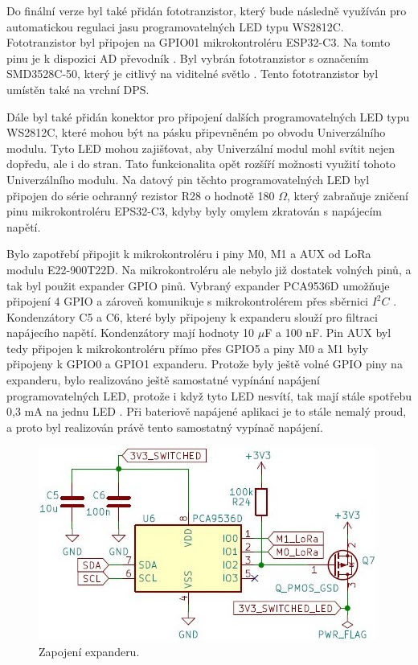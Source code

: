 Do finální verze byl také přidán fototranzistor, který bude následně využíván pro automatickou regulaci jasu programovatelných LED typu WS2812C. Fototranzistor byl připojen na GPIO01 mikrokontroléru ESP32-C3. Na tomto 
pinu je k dispozici AD převodník \cite{ESP_C3_dtsh}. Byl vybrán fototranzistor s označením SMD3528C-50, který je citlivý na viditelné světlo \cite{Phototransistor}.
Tento fototranzistor byl umístěn také na vrchní DPS. 

Dále byl také 
přidán konektor pro připojení dalších programovatelných LED typu WS2812C, které mohou být na pásku připevněném po obvodu Univerzálního modulu. Tyto LED mohou zajišťovat, aby Univerzální modul mohl svítit 
nejen dopředu, ale i do stran. Tato funkcionalita opět rozšíří možnosti využití tohoto Univerzálního modulu. Na datový pin těchto programovatelných LED byl připojen do série ochranný rezistor R28 o hodnotě 
180 $\Omega$, který 
zabraňuje zničení pinu mikrokontroléru EPS32-C3, kdyby byly omylem zkratován s napájecím napětí. 

Bylo zapotřebí připojit k mikrokontroléru i piny M0, M1 a AUX od LoRa modulu E22-900T22D. Na mikrokontroléru ale nebylo již dostatek volných pinů, a tak byl použit expander GPIO pinů. Vybraný expander
PCA9536D umožňuje připojení 4 GPIO a zároveň komunikuje s mikrokontrolérem přes sběrnici $I^2C$ \cite{expander}. Kondenzátory C5 a C6, které byly připojeny k expanderu slouží pro filtraci napájecího napětí. 
Kondenzátory mají hodnoty 10 $\mu$F a 100 nF. Pin AUX byl tedy připojen k mikrokontroléru přímo přes GPIO5 a piny M0 a M1 byly připojeny k GPIO0 
a GPIO1 expanderu. Protože byly ještě volné GPIO piny na expanderu, bylo realizováno ještě samostatné vypínání napájení programovatelných LED, protože i když tyto LED nesvítí, tak mají stále spotřebu 
0,3 mA na jednu LED \cite{WS2812C_dtsh}. Při bateriově napájené aplikaci je to stále nemalý proud, a proto byl realizován právě tento samostatný vypínač napájení. 

\begin{figure}[!h]
  \begin{center}
    \includegraphics[scale=0.8]{obrazky/expander.jpg}
  \end{center}
  \caption[Zapojení expanderu]{Zapojení expanderu.}
\end{figure}

